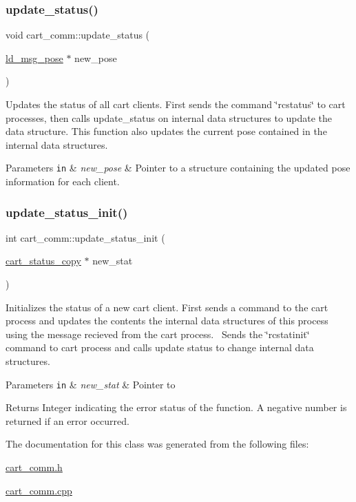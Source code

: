 \subsubsection{\texorpdfstring{update\+\_\+status()}{update\_status()}\hspace{0.1cm}{\footnotesize\ttfamily [2/2]}}
{\footnotesize\ttfamily void cart\+\_\+comm\+::update\+\_\+status (\begin{DoxyParamCaption}\item[{\hyperlink{structld__msg__pose}{ld\+\_\+msg\+\_\+pose} $\ast$}]{new\+\_\+pose }\end{DoxyParamCaption})}

Updates the status of all cart clients. First sends the command \char`\"{}rcstatus\char`\"{} to cart processes, then calls update\+\_\+status on internal data structures to update the data structure. This function also updates the current pose contained in the internal data structures. 
\begin{DoxyParams}[1]{Parameters}
\mbox{\tt in}  & {\em new\+\_\+pose} & Pointer to a structure containing the updated pose information for each client. \\
\hline
\end{DoxyParams}
\mbox{\label{classcart__comm_aa4aa3baa5fae85a6469ae9683a6d2cbc}} 
\subsubsection{\texorpdfstring{update\+\_\+status\+\_\+init()}{update\_status\_init()}}
{\footnotesize\ttfamily int cart\+\_\+comm\+::update\+\_\+status\+\_\+init (\begin{DoxyParamCaption}\item[{\hyperlink{classcart__status__copy}{cart\+\_\+status\+\_\+copy} $\ast$}]{new\+\_\+stat }\end{DoxyParamCaption})}

Initializes the status of a new cart client. First sends a command to the cart process and updates the contents the internal data structures of this process using the message recieved from the cart process.~\newline
Sends the \char`\"{}rcstatinit\char`\"{} command to cart process and calls update status to change internal data structures. 
\begin{DoxyParams}[1]{Parameters}
\mbox{\tt in}  & {\em new\+\_\+stat} & Pointer to \\
\hline
\end{DoxyParams}
\begin{DoxyReturn}{Returns}
Integer indicating the error status of the function. A negative number is returned if an error occurred. 
\end{DoxyReturn}


The documentation for this class was generated from the following files\+:\begin{DoxyCompactItemize}
\item 
\hyperlink{cart__comm_8h}{cart\+\_\+comm.\+h}\item 
\hyperlink{cart__comm_8cpp}{cart\+\_\+comm.\+cpp}\end{DoxyCompactItemize}
